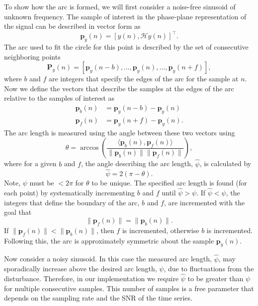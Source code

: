 \documentclass[a4paper]{IEEEtran}
\begin{document}
To show how the arc is formed, we will first consider a noise-free sinusoid of unknown frequency. The sample of interest in the phase-plane representation of the signal can be described in vector form as
\begin{equation}
	\mathbf{p}_y(n) = \left[y\left(n\right),\mathcal{H}y\left(n\right)\right]^{\top}.
\end{equation}
The arc used to fit the circle for this point is described by the set of consecutive neighboring points
\begin{equation}
	\mathbf{P}_y(n) = \left[\mathbf{p}_y(n-b),\hdots,\mathbf{p}_y(n),\hdots,\mathbf{p}_y(n+f)\right],
\end{equation}
where $b$ and $f$ are integers that specify the edges of the arc for the sample at $n$. Now we define the vectors that describe the samples at the edges of the arc relative to the samples of interest as
\begin{align}
	\mathbf{p}_b(n) &= \mathbf{p}_y(n-b)-\mathbf{p}_y(n) \\
	\mathbf{p}_f(n) &= \mathbf{p}_y(n+f)-\mathbf{p}_y(n).
\end{align}
The arc length is measured using the angle between these two vectors using
\begin{equation}
	\theta = \arccos\left(\frac{\langle\mathbf{p}_b(n),\mathbf{p}_f(n)\rangle}{\|\mathbf{p}_b(n)\| \|\mathbf{p}_f(n)\|}\right),
\end{equation}
where for a given $b$ and $f$, the angle describing the arc length, $\hat\psi$, is calculated by
\begin{equation}\label{eq:theta_2_psi}
	\hat\psi = 2(\pi-\theta).
\end{equation}
Note, $\psi$ must be $<2\pi$ for $\theta$ to be unique. The specified arc length is found (for each point) by systematically incrementing $b$ and $f$ until $\hat\psi > \psi$. If $\hat\psi < \psi$, the integers that define the boundary of the arc, $b$ and $f$, are incremented with the goal that
\begin{equation}\label{eq:balanced_distances}
	\|\mathbf{p}_f(n)\| = \|\mathbf{p}_b(n)\|.
\end{equation}
If $\|\mathbf{p}_f(n)\| < \|\mathbf{p}_b(n)\|$, then $f$ is incremented, otherwise $b$ is incremented. Following this, the arc is approximately symmetric about the sample $\mathbf{p}_y(n)$. 

Now consider a noisy sinusoid. In this case the measured arc length, $\hat\psi$, may sporadically increase above the desired arc length, $\psi$, due to fluctuations from the disturbance. Therefore, in our implementation we require $\hat\psi$ to be greater than $\psi$ for multiple consecutive samples. This number of samples is a free parameter that depends on the sampling rate and the SNR of the time series. 
\end{document}
